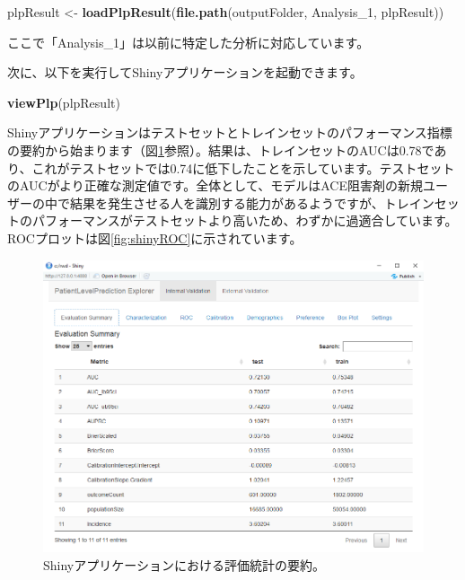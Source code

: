 \documentclass[
  11pt]{book}
\newenvironment{Shaded}{\begin{snugshade}}{\end{snugshade}}
\newcommand{\FunctionTok}[1]{\textcolor[rgb]{0.13,0.29,0.53}{\textbf{#1}}}
\newcommand{\NormalTok}[1]{#1}
\newcommand{\OtherTok}[1]{\textcolor[rgb]{0.56,0.35,0.01}{#1}}
\newcommand{\StringTok}[1]{\textcolor[rgb]{0.31,0.60,0.02}{#1}}
\theoremstyle{definition}
\theoremstyle{definition}
\theoremstyle{definition}
\theoremstyle{definition}
\theoremstyle{remark}
\begin{document}
\begin{Shaded}
\begin{Highlighting}[]
\NormalTok{plpResult }\OtherTok{\textless{}{-}} \FunctionTok{loadPlpResult}\NormalTok{(}\FunctionTok{file.path}\NormalTok{(outputFolder,}
                                     \StringTok{\textquotesingle{}Analysis\_1\textquotesingle{}}\NormalTok{,}
                                     \StringTok{\textquotesingle{}plpResult\textquotesingle{}}\NormalTok{))}
\end{Highlighting}
\end{Shaded}

ここで「Analysis\_1」は以前に特定した分析に対応しています。

次に、以下を実行してShinyアプリケーションを起動できます。

\begin{Shaded}
\begin{Highlighting}[]
\FunctionTok{viewPlp}\NormalTok{(plpResult)}
\end{Highlighting}
\end{Shaded}

Shinyアプリケーションはテストセットとトレインセットのパフォーマンス指標の要約から始まります（図\ref{fig:shinySummary}参照）。結果は、トレインセットのAUCは0.78であり、これがテストセットでは0.74に低下したことを示しています。テストセットのAUCがより正確な測定値です。全体として、モデルはACE阻害剤の新規ユーザーの中で結果を発生させる人を識別する能力があるようですが、トレインセットのパフォーマンスがテストセットより高いため、わずかに過適合しています。ROCプロットは図\ref{fig:shinyROC}に示されています。

\begin{figure}
\includegraphics[width=1\linewidth]{images/PatientLevelPrediction/shinysummary} \caption{Shinyアプリケーションにおける評価統計の要約。}\label{fig:shinySummary}
\end{figure}
\end{document}
